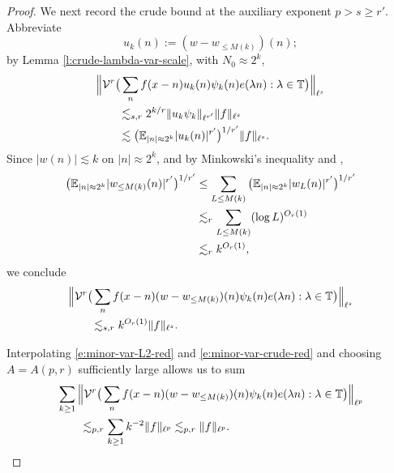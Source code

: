 \documentclass[12pt]{amsart}
\numberwithin{equation}{section}
\theoremstyle{definition}
\begin{document}
\begin{proof}
We next record the crude bound at the auxiliary exponent \(p > s \geq r'\). Abbreviate
\[
    u_k(n):=(w-w_{\leq M(k)})(n);
\]
by Lemma \ref{l:crude-lambda-var-scale}, with \(N_0\approx 2^k\), 
\begin{align}
    &\Big\|
    \mathcal{V}^r\big(
    \sum_n f(x-n)u_k(n)\psi_k(n)e(\lambda n):\lambda\in\mathbb T
    \big)
    \Big\|_{\ell^s}
    \notag\\
    &\qquad\lesssim_{s,r}
    2^{k/r}\|u_k\psi_k\|_{\ell^{r'}}\|f\|_{\ell^s} \\
    & \qquad \lesssim \big(
    \mathbb E_{|n|\approx 2^k}|u_k(n)|^{r'}
    \big)^{1/r'} \|f\|_{\ell^s}.
\end{align}
Since \(|w(n)|\lesssim k\) on \(|n|\approx2^k\), and
by Minkowski's inequality and \cite[Lemma 3.1]{FKT1},
\begin{align}
    \big(
    \mathbb E_{|n|\approx 2^k}|w_{\leq M(k)}(n)|^{r'}
    \big)^{1/r'}
    &\leq
    \sum_{L\leq M(k)}
    \big(
    \mathbb E_{|n|\approx 2^k}|w_L(n)|^{r'}
    \big)^{1/r'}
    \notag\\
    &\lesssim_r
    \sum_{L\leq M(k)}(\log L)^{O_r(1)}
    \notag\\
    &\lesssim_r
    k^{O_r(1)},
\end{align}
we conclude
\begin{align}\label{e:minor-var-crude-red}
    &\Big\|
    \mathcal{V}^r\big(
    \sum_n f(x-n)(w-w_{\leq M(k)})(n)\psi_k(n)e(\lambda n):
    \lambda\in\mathbb T
    \big)
    \Big\|_{\ell^s}
    \notag\\
    &\qquad\lesssim_{s,r}
    k^{O_r(1)}
    \|f\|_{\ell^s}.
\end{align}

Interpolating \eqref{e:minor-var-L2-red} and \eqref{e:minor-var-crude-red} and choosing $A = A(p,r)$ sufficiently large allows us to sum
\begin{align}
    &
    \sum_{k\geq1} \Big\|
    \mathcal{V}^r\big(
    \sum_n f(x-n)(w-w_{\leq M(k)})(n)\psi_k(n)e(\lambda n):
    \lambda\in\mathbb T
    \big)
    \Big\|_{\ell^p}
    \notag\\
    &\qquad\lesssim_{p,r}
    \sum_{k\geq1}k^{-2}\|f\|_{\ell^p}
    \lesssim_{p,r}
    \|f\|_{\ell^p}.
\end{align}


\end{proof}
\end{document}
